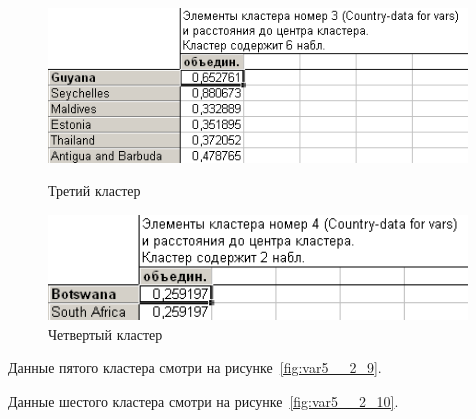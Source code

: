 \begin{figure}[!h]
  \centering
  \begin{minipage}{0.49\textwidth}
    \centering

    \includegraphics[width=0.99\textwidth]
    {inc/cars_my/var5__2_7.PNG}

    \caption{Третий кластер}
    \label{fig:var5__2_7}
  \end{minipage}
  \begin{minipage}{0.49\textwidth}
    \centering

    \includegraphics[width=0.99\textwidth]
    {inc/cars_my/var5__2_8.PNG}

    \caption{Четвертый кластер}
    \label{fig:var5__2_8}
  \end{minipage}
\end{figure}

\newpage

Данные пятого кластера смотри на рисунке~\ref{fig:var5__2_9}.

Данные шестого кластера смотри на рисунке~\ref{fig:var5__2_10}.

